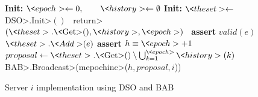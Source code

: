 \begin{figure}[t!]
  \begin{adjustbox}{minipage=[t]{\columnwidth}}
    \begin{algorithm}[H]
      \caption{\small Server $i$ implementation using DSO and BAB}%
      \label{DPO-alg1}%
      \small
      \begin{algorithmic}[1]
                \State \textbf{Init:} $\<epoch> \leftarrow 0,\hspace{2em}\<history>\leftarrow\emptyset$\label{alg1:history}
            \State \textbf{Init:} $\<theset> \leftarrow $\<DSO>.\<Init>\(()\)~\label{alg1:init_e}
              \State \<return> $(\<theset>.\text{\<Get>}(), \<history>,\<epoch>)$~\label{alg1:func_get}
            \EndFunction
            \State \textbf{assert} {\(valid(e)\)}
            \State $\<theset>.{\<Add>}(e)$
            \EndFunction
            \setcounter{ALG@line}{11}
            \label{alg1:epoch_inc}
              \State \textbf{assert} $h \equiv \<epoch> + 1$
              \State $proposal \leftarrow
                \<theset>.\text{\<Get>}()
                \setminus \bigcup_{k=1}^{\<epoch>} \<history>(k)$~\label{alg1:proposal}
              \State \<BAB>.\<Broadcast>(\<mepochinc>($h, proposal, i$))\label{alg1:bcast_proposal}
            \EndFunction
            \label{alg1:upon_delivery} %

\end{algorithmic}
\end{algorithm}
\end{adjustbox}
\end{figure}
